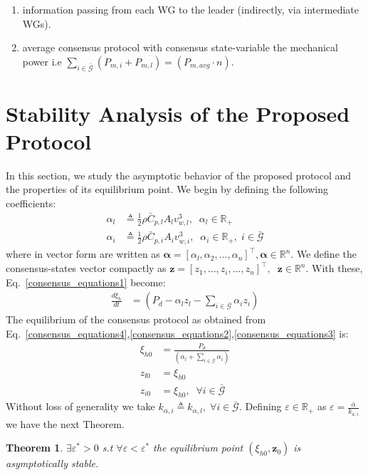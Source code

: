 \documentclass[letterpaper, 10 pt, conference]{ieeeconf}
\newcommand{\matr}[1]{\mathbf{#1}}
\newtheorem{theorem}{\textnormal{\textbf{Theorem}}}
\begin{document}
\begin{enumerate}
\item information passing from each WG to the leader (indirectly, via intermediate WGs).
 \item  average consensus protocol \cite{murray} with consensus state-variable the mechanical power i.e $\sum_{i\in\bar{\mathcal{G}}} (P_{m,i}+P_{m,l})=(P_{m,avg}\cdot n)$.
\end{enumerate}

\section{Stability Analysis of the Proposed Protocol}
In this section, we study the asymptotic behavior of the proposed protocol and the properties of its equilibrium point. We begin by defining the following coefficients:
\begin{align}
\alpha_l&\triangleq\frac{1}{2}\rho \bar{C}_{p,l}  A_{l} v_{w,l}^3,\;\;\alpha_l \in\mathbb{R}_{+} \\
 \alpha_i&\triangleq\frac{1}{2}\rho \bar{C}_{p,i} A_{i} v_{w,i}^3 ,\;\;\alpha_i \in\mathbb{R}_{+},\;i\in\bar{\mathcal{G}}
\end{align}
 where in vector form are written as $\pmb{\alpha}=[\alpha_l,\alpha_2, ... ,\alpha_{n}]^\top, \pmb{\alpha} \in \mathbb{R}^n$.  We define the consensus-states vector compactly as $\matr{z}=[z_1,... ,z_i,..., z_n]^\top,\;\; \matr{z}\in\mathbb{R}^n$. With these, Eq.~\eqref{consensus_equations1} become:
\begin{subequations}
\begin{align}
\frac{d\xi_h}{dt}&=(P_d-\alpha_lz_l-\sum_{i\in\bar{\mathcal{G}}} \alpha_i z_i)\label{consensus_equations4}
\end{align}
\end{subequations}
The equilibrium of the consensus protocol as obtained from Eq.~\eqref{consensus_equations4},\eqref{consensus_equations2},\eqref{consensus_equations3} is:
\begin{align}
 \xi_{h0}&=\frac{P_d}{(\alpha_l+\sum_{i\in\bar{\mathcal{G}}}\alpha_i)}\\
z_{l0}&=\xi_{h0}\\
z_{i0}&=\xi_{h0},\;\; \forall i\in\bar{\mathcal{G}}
\end{align} 
Without loss of generality we take $k_{\alpha,i}\triangleq k_{\alpha,l},\;\forall i\in \bar{\mathcal{G}}$. Defining $\varepsilon\in\mathbb{R}_{+}$ as $\varepsilon=\frac{\bar{\alpha}}{k_{a,i}}$  we have the next Theorem.
\begin{theorem}
$\exists\varepsilon^*>0$ s.t  $\forall\varepsilon<\varepsilon^*$ the equilibrium point $(\xi_{h0},\matr{z}_0)$ is \textit{asymptotically stable}.
\end{theorem}
\end{document}
